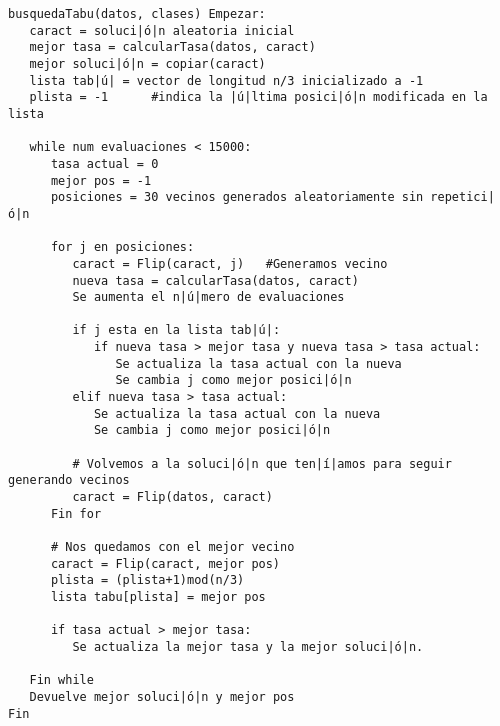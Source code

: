 \documentclass[12pt]{article}
\begin{document}
\begin{lstlisting}
busquedaTabu(datos, clases) Empezar:
   caract = soluci|ó|n aleatoria inicial
   mejor tasa = calcularTasa(datos, caract)
   mejor soluci|ó|n = copiar(caract)
   lista tab|ú| = vector de longitud n/3 inicializado a -1
   plista = -1		#indica la |ú|ltima posici|ó|n modificada en la lista

   while num evaluaciones < 15000:
      tasa actual = 0
      mejor pos = -1
      posiciones = 30 vecinos generados aleatoriamente sin repetici|ó|n
      
      for j en posiciones:
         caract = Flip(caract, j) 	#Generamos vecino
         nueva tasa = calcularTasa(datos, caract)
         Se aumenta el n|ú|mero de evaluaciones
         
         if j esta en la lista tab|ú|:
            if nueva tasa > mejor tasa y nueva tasa > tasa actual:
               Se actualiza la tasa actual con la nueva
               Se cambia j como mejor posici|ó|n
         elif nueva tasa > tasa actual:
            Se actualiza la tasa actual con la nueva
            Se cambia j como mejor posici|ó|n
            
         # Volvemos a la soluci|ó|n que ten|í|amos para seguir generando vecinos
         caract = Flip(datos, caract)
      Fin for
      
      # Nos quedamos con el mejor vecino
      caract = Flip(caract, mejor pos)
      plista = (plista+1)mod(n/3)
      lista tabu[plista] = mejor pos
   
      if tasa actual > mejor tasa:
         Se actualiza la mejor tasa y la mejor soluci|ó|n.

   Fin while
   Devuelve mejor soluci|ó|n y mejor pos
Fin

\end{lstlisting}
\end{document}
